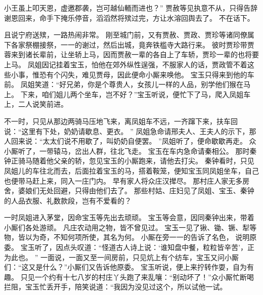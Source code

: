 小王虽上叩天恩，虚邀郡袭，岂可越仙輀而进也？”
贾赦等见执意不从，只得告辞谢恩回来，命手下掩乐停音，滔滔然将殡过完，方让水溶回舆去了。
不在话下。
\par
且说宁府送殡，一路热闹非常。
刚至城门前，又有贾赦、贾政、贾珍等诸同僚属下各家祭棚接祭，一一的谢过，然后出城，竟奔铁槛寺大路行来。
彼时贾珍带贾蓉来到诸长辈前，让坐轿上马，因而贾赦一辈的各自上了车轿，贾珍一辈的也将要上马。
凤姐因记挂着宝玉，怕他在郊外纵性逞强，不服家人的话，贾政管不着这些小事，惟恐有个闪失，难见贾母，因此便命小厮来唤他。
宝玉只得来到他的车前。
凤姐笑道：“好兄弟，你是个尊贵人，女孩儿一样的人品，别学他们猴在马上。
下来，咱们姐儿两个坐车，岂不好？”宝玉听说，便忙下了马，爬入凤姐车上，二人说笑前进。
\par
不一时，只见从那边两骑马压地飞来，离凤姐车不远，一齐蹿下来，扶车回说：“这里有下处，奶奶请歇息、更衣。
”
凤姐急命请邢夫人、王夫人的示下，那人回来说：“太太们说不用歇了，叫奶奶自便罢。
”凤姐听了，便命歇歇再走。
众小厮听了，一带辕马，岔出人群，往北飞走。
宝玉在车内急命请秦相公。
那时秦钟正骑马随着他父亲的轿，忽见宝玉的小厮跑来，请他去打尖。
秦钟看时，只见凤姐儿的车往北而去，后面拉着宝玉的马，搭着鞍笼，便知宝玉同凤姐坐车，自己也便带马赶上来，同入一庄门内。
早有家人将众庄汉撵尽。
那村庄人家无多房舍，婆娘们无处回避，只得由他们去了。
那些村姑、庄妇见了凤姐、宝玉、秦钟的人品衣服、礼数款段，岂有不爱看的？\par
一时凤姐进入茅堂，因命宝玉等先出去顽顽。
宝玉等会意，因同秦钟出来，带着小厮们各处游顽。
凡庄农动用之物，皆不曾见过。
宝玉一见了锹、锄、镢、犁等物，皆以为奇，不知何项所使，其名为何。
小厮在旁一一的告诉了名色，
说明原委。
宝玉听了，因点头叹道：“怪道古人诗上说：‘谁知盘中餐，粒粒皆辛苦’，正为此也。
”
一面说，一面又至一间房前，只见炕上有个纺车，宝玉又问小厮们：“这又是什么？”小厮们又告诉他原委。
宝玉听说，便上来拧转作耍，自为有趣。
只见一个约有十七八岁的村庄丫头跑了来乱嚷：“别动坏了！”众小厮忙断喝拦阻，宝玉忙丢开手，陪笑说道：“我因为没见过这个，所以试他一试。
